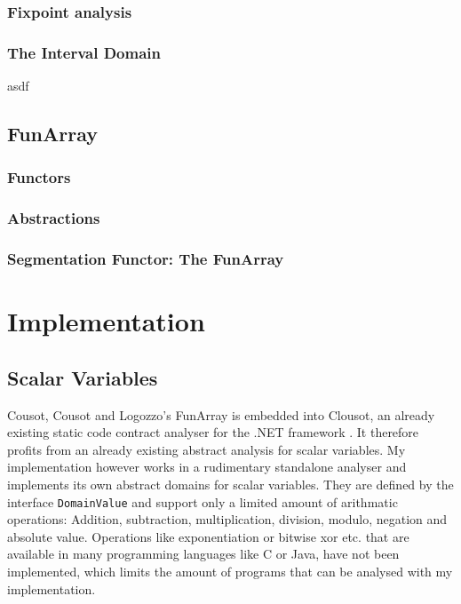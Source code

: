 \documentclass{report}
\begin{document}
\subsection{Fixpoint analysis}

\subsection{The Interval Domain}
asdf



\section{FunArray}
\subsection{Functors}
\subsection{Abstractions}
\subsection{Segmentation Functor: The FunArray}




\chapter{Implementation}



\section{Scalar Variables}\label{sec:scalarvariables}
Cousot, Cousot and Logozzo's FunArray is embedded into Clousot, an already existing static code contract analyser for the .NET framework \cite{cousot2011}. It therefore profits from an already existing abstract analysis for scalar variables. My implementation however works in a rudimentary standalone analyser and implements its own abstract domains for scalar variables.
They are defined by the interface \texttt{DomainValue} and support only a limited amount of arithmatic operations: Addition, subtraction, multiplication, division, modulo, negation and absolute value. Operations like exponentiation or bitwise xor etc. that are available in many programming languages like C or Java, have not been implemented, which limits the amount of programs that can be analysed with my implementation. 
\end{document}
